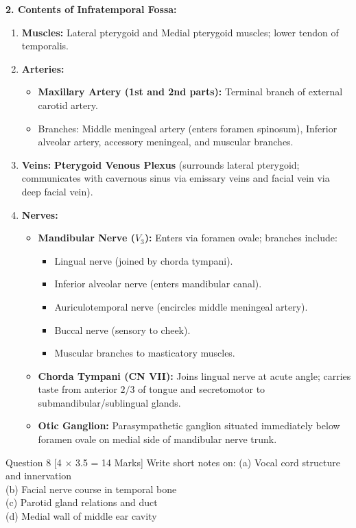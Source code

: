 \documentclass[11pt,a4paper]{article}
\begin{document}
\begin{ansbox}
\textbf{2. Contents of Infratemporal Fossa:}
\begin{enumerate}[leftmargin=*]
    \item \textbf{Muscles:} Lateral pterygoid and Medial pterygoid muscles; lower tendon of temporalis.
    \item \textbf{Arteries:}
    \begin{itemize}
        \item \textbf{Maxillary Artery (1st and 2nd parts):} Terminal branch of external carotid artery.
        \item Branches: Middle meningeal artery (enters foramen spinosum), Inferior alveolar artery, accessory meningeal, and muscular branches.
    \end{itemize}
    \item \textbf{Veins:} \textbf{Pterygoid Venous Plexus} (surrounds lateral pterygoid; communicates with cavernous sinus via emissary veins and facial vein via deep facial vein).
    \item \textbf{Nerves:}
    \begin{itemize}
        \item \textbf{Mandibular Nerve ($V_3$):} Enters via foramen ovale; branches include:
        \begin{itemize}
            \item Lingual nerve (joined by chorda tympani).
            \item Inferior alveolar nerve (enters mandibular canal).
            \item Auriculotemporal nerve (encircles middle meningeal artery).
            \item Buccal nerve (sensory to cheek).
            \item Muscular branches to masticatory muscles.
        \end{itemize}
        \item \textbf{Chorda Tympani (CN VII):} Joins lingual nerve at acute angle; carries taste from anterior $2/3$ of tongue and secretomotor to submandibular/sublingual glands.
        \item \textbf{Otic Ganglion:} Parasympathetic ganglion situated immediately below foramen ovale on medial side of mandibular nerve trunk.
    \end{itemize}
\end{enumerate}
\end{ansbox}

\begin{qbox}{Question 8 [4 $\times$ 3.5 = 14 Marks]}
Write short notes on:
(a) Vocal cord structure and innervation \\
(b) Facial nerve course in temporal bone \\
(c) Parotid gland relations and duct \\
(d) Medial wall of middle ear cavity
\end{qbox}
\end{document}
